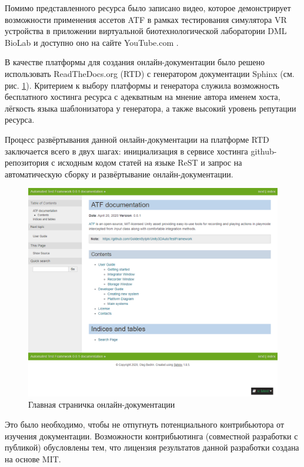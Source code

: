 Помимо представленного ресурса было записано видео, которое демонстрирует возможности применения ассетов ATF в рамках тестирования симулятора VR устройства в приложении виртуальной биотехнологической лаборатории DML BioLab \cite{biolab} и доступно оно на сайте YouTube.com \cite{video}.

В качестве платформы для создания онлайн-документации было решено использовать ReadTheDocs.org (RTD) с генератором документации Sphinx (см. рис. \ref{online_docs}). Критерием к выбору платформы и генератора служила возможность бесплатного хостинга ресурса с адекватным на мнение автора именем хоста, лёгкость языка шаблонизатора у генератора, а также высокий уровень репутации ресурса.

Процесс развёртывания данной онлайн-документации на платформе RTD заключается всего в двух шагах: инициализация в сервисе хостинга github-репозитория с исходным кодом статей на языке ReST и запрос на автоматическую сборку и развёртывание онлайн-документации.

\begin{figure}[H]
	\centering
	\includegraphics[width=\linewidth]{online_docs.png}
	\caption{Главная страничка онлайн-документации}
	\label{online_docs}
\end{figure}

Это было необходимо, чтобы не отпугнуть потенциального контрибьютора от изучения документации. Возможности контрибьютинга (совместной разработки с публикой) обусловлены тем, что лицензия результатов данной разработки создана на основе MIT.

